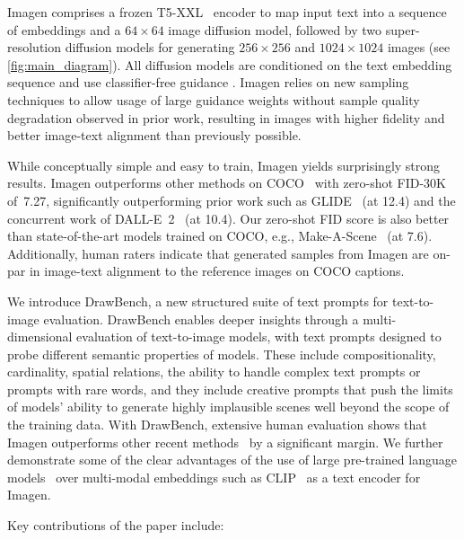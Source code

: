 Imagen comprises a frozen T5-XXL~\cite{raffel-jmlr-2020} encoder to map input text into a sequence of embeddings and a $64\!\times\!64$ image diffusion model, followed by two super-resolution diffusion models for generating $256\!\times\!256$ and $1024\!\times\!1024$ images (see \ref{fig:main_diagram}). All diffusion models are conditioned on the text embedding sequence and use classifier-free guidance \cite{ho2021classifierfree}. Imagen relies on new sampling techniques to allow usage of large guidance weights without sample quality degradation observed in prior work, resulting in images with higher fidelity and better image-text alignment than previously possible. 

While conceptually simple and easy to train, Imagen yields surprisingly strong results.  Imagen outperforms other methods on COCO~\cite{lin-eccv-2014} with zero-shot FID-30K of~7.27, significantly outperforming prior work such as GLIDE~\cite{nichol-glide} (at 12.4) and the concurrent work of DALL-E~2~\cite{ramesh-dalle2} (at 10.4). Our zero-shot FID score is also better than state-of-the-art models trained on COCO, e.g., Make-A-Scene~\cite{gafni2022make} (at 7.6). Additionally, human raters indicate that generated samples from Imagen are on-par in image-text alignment to the reference images on COCO captions.

We introduce DrawBench, a new structured suite of text prompts for text-to-image evaluation. DrawBench enables deeper insights through a multi-dimensional evaluation of  text-to-image models, with text prompts designed to probe different semantic properties of models.  These include compositionality, cardinality, spatial relations, the ability to handle complex text prompts or prompts with rare words, and they include creative prompts that push the limits of models' ability to generate highly implausible scenes well beyond the scope of the training data. With DrawBench, extensive human evaluation shows that Imagen outperforms other recent methods~\cite{rombach-cvpr-2022, crowson2022vqgan, ramesh-dalle2} by a significant margin. We further demonstrate some of the clear advantages of the use of large pre-trained language models~\cite{raffel-jmlr-2020} over multi-modal embeddings such as CLIP~\cite{radford-icml-2021} as a text encoder for Imagen.

Key contributions of the paper include:

